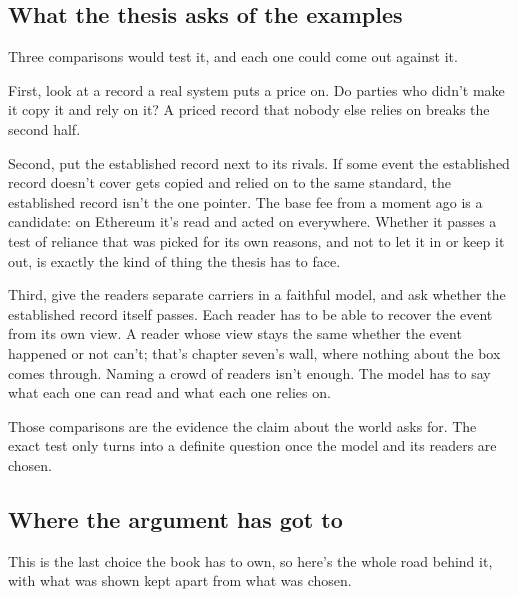 \documentclass[11pt,twoside]{article}
\theoremstyle{thielethm}
\theoremstyle{thieledef}
\theoremstyle{thieledef}
\theoremstyle{thieledef}
\theoremstyle{thielethm}
\theoremstyle{thieleobs}
\theoremstyle{thielethm}
\begin{document}
\subsection{What the thesis asks of the examples}

Three comparisons would test it, and each one could come out against it.

First, look at a record a real system puts a price on. Do parties who didn't make it copy it and rely on it? A priced record that nobody else relies on breaks the second half.

Second, put the established record next to its rivals. If some event the established record doesn't cover gets copied and relied on to the same standard, the established record isn't the one pointer. The base fee from a moment ago is a candidate: on Ethereum it's read and acted on everywhere. Whether it passes a test of reliance that was picked for its own reasons, and not to let it in or keep it out, is exactly the kind of thing the thesis has to face.

Third, give the readers separate carriers in a faithful model, and ask whether the established record itself passes. Each reader has to be able to recover the event from its own view. A reader whose view stays the same whether the event happened or not can't; that's chapter seven's wall, where nothing about the box comes through. Naming a crowd of readers isn't enough. The model has to say what each one can read and what each one relies on.

Those comparisons are the evidence the claim about the world asks for. The exact test only turns into a definite question once the model and its readers are chosen.

\subsection{Where the argument has got to}

This is the last choice the book has to own, so here's the whole road behind it, with what was shown kept apart from what was chosen.
\end{document}
